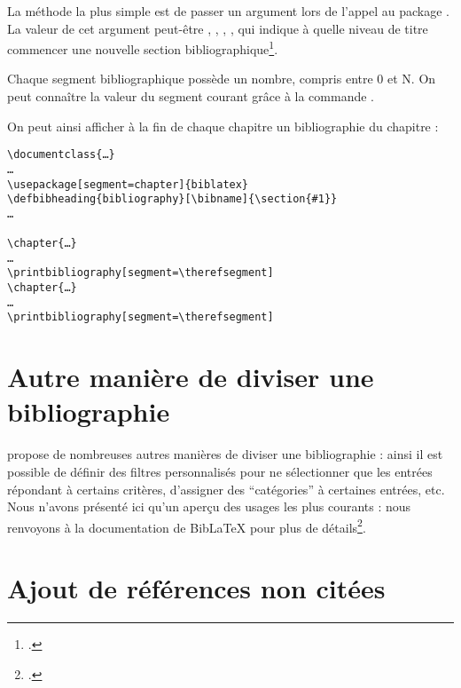 La méthode la plus simple est de passer un argument  lors de l'appel au package . La valeur de cet argument peut-être , , , , qui indique à quelle niveau de titre commencer une nouvelle section bibliographique\footcite[Il est toutefois possible de créer des sections bibliographiques autrement que suivant les niveaux de titre, voir :]{biblatex_segment}.

Chaque segment bibliographique possède un nombre, compris entre 0 et N. On peut connaître la valeur du segment courant grâce à la commande .

On peut ainsi afficher à la fin de chaque chapitre un bibliographie du chapitre :

\begin{verbatim}
\documentclass{…}
…
\usepackage[segment=chapter]{biblatex}
\defbibheading{bibliography}[\bibname]{\section{#1}}
…

\chapter{…}
…
\printbibliography[segment=\therefsegment]
\chapter{…}
…
\printbibliography[segment=\therefsegment]

\end{verbatim}

\section{Autre manière de diviser une bibliographie}

 propose de nombreuses autres manières de diviser une bibliographie : ainsi il est possible de définir des filtres personnalisés pour ne sélectionner que les entrées répondant à certains critères, d'assigner des \enquote{catégories} à certaines entrées, etc. Nous n'avons présenté ici qu'un aperçu des usages les plus courants : nous renvoyons à la documentation de BibLaTeX pour plus de détails\footcite{biblatex_bibliographycommands}.

\section{Ajout de références non citées}

